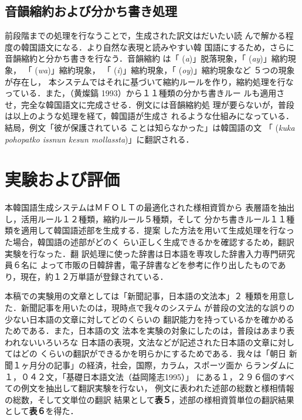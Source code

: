 \subsection{音韻縮約および分かち書き処理}
前段階までの処理を行なうことで，生成された訳文はだいたい読
んで解かる程度の韓国語文になる．より自然な表現と読みやすい韓
国語にするため，さらに音韻縮約と分かち書きを行なう．音韻縮約
は「 ({\it a})」脱落現象，「 ({\it ay})」縮約現象，
「 ({\it wa})」縮約現象，
「 ({\it i})」縮約現象，「 ({\it oy})」縮約現象など
５つの現象が存在し，
本システムではそれに基づいて縮約ルールを作り，縮約処理を行な
っている．また，（黄燦鎬 1993）から１１種類の分かち書きルー
ルも適用させ，完全な韓国語文に完成させる．例文には音韻縮約処
理が要らないが，普段は以上のような処理を経て，韓国語が生成さ
れるような仕組みになっている．結局，例文「彼が保護されている
ことは知らなかった」は韓国語の文
「
 ({\it kuka pohopatko issnun kesun mollassta})」に翻訳される．


\section{実験および評価}
本韓国語生成システムはＭＦＯＬＴの最適化された様相資質から
表層語を抽出し，活用ルール１２種類，縮約ルール５種類，そして
分かち書きルール１１種類を適用して韓国語述部を生成する．提案
した方法を用いて生成処理を行なった場合，韓国語の述部がどのく
らい正しく生成できるかを確認するため，翻訳実験を行なった．翻
訳処理に使った辞書は日本語を専攻した辞書入力専門研究員６名に
よって市販の日韓辞書，電子辞書などを参考に作り出したものであ
り，現在，約１２万単語が登録されている．

本稿での実験用の文章としては「新聞記事，日本語の文法本」２
種類を用意した．新聞記事を用いたのは，現時点で我々のシステム
が普段の文法的な誤りの少ない日本語の文章に対してどのくらいの
翻訳能力を持っているかを確かめるためである．また，日本語の文
法本を実験の対象にしたのは，普段はあまり表われないいろいろな
日本語の表現，文法などが記述された日本語の文章に対してはどの
くらいの翻訳ができるかを明らかにするためである．我々は「朝日
新聞１ヶ月分の記事」の経済，社会，国際，カラム，スポーツ面か
らランダムに１，０４２文，「基礎日本語文法（益岡隆志1995）」
にある１，２９６個のすべての例文を抽出して翻訳実験を行ない，
例文に表われた述部の総数と様相情報の総数，そして文単位の翻訳
結果として{\bf 表５}，述部の様相資質単位の翻訳結果として{\bf 表６}を得た．


